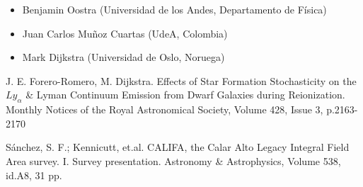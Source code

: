 \documentclass[12pt]{article}
\begin{document}

\begin{itemize}
	\item Benjamin Oostra (Universidad de los Andes, Departamento de F\'isica)
	\item Juan Carlos Mu\~noz Cuartas (UdeA, Colombia)
	\item Mark Dijkstra (Universidad de Oslo, Noruega)
\end{itemize}


\begin{thebibliography}{10}

 J. E. Forero-Romero, M. Dijkstra. Effects of Star Formation Stochasticity on the $Ly_{\alpha}$ \&
Lyman Continuum Emission from Dwarf Galaxies during
Reionization. Monthly Notices of the Royal Astronomical Society, Volume 428, Issue 3, p.2163-2170

 S\'anchez, S. F.; Kennicutt, et.al. CALIFA, the Calar Alto Legacy Integral Field Area survey. I. Survey presentation. Astronomy \& Astrophysics, Volume 538, id.A8, 31 pp.



\end{thebibliography}
\end{document}
